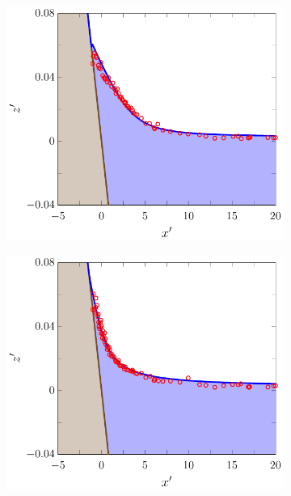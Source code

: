 \begin{figure}
\begin{subfigure}{0.5\textwidth}
		\vspace{0.5cm}
	\end{subfigure}
	\begin{subfigure}{0.5\textwidth}
		\includegraphics[width=\textwidth]{./chp6/figures/Experiment/Synolakis/H0p0185/FEVM/50s.pdf}
		\vspace{0.5cm}
	\end{subfigure}%
	\begin{subfigure}{0.5\textwidth}
		\includegraphics[width=\textwidth]{./chp6/figures/Experiment/Synolakis/H0p0185/FEVM/60s.pdf}

\end{subfigure}
\end{figure}
